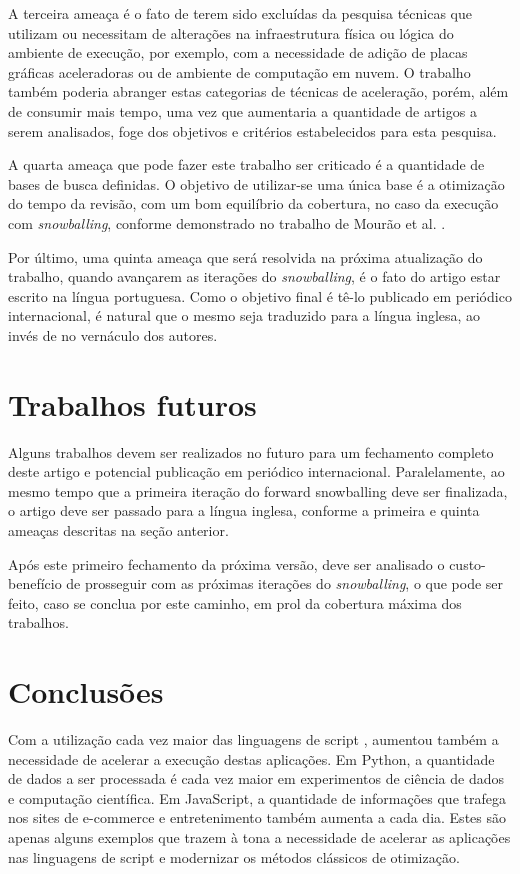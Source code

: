 \documentclass[sigconf]{acmart}
\begin{document}
A terceira ameaça é o fato de terem sido excluídas da pesquisa técnicas que utilizam ou necessitam de alterações na infraestrutura física ou lógica do ambiente de execução, por exemplo, com a necessidade de adição de placas gráficas aceleradoras ou de ambiente de computação em nuvem. O trabalho também poderia abranger estas categorias de técnicas de aceleração, porém, além de consumir mais tempo, uma vez que aumentaria a quantidade de artigos a serem analisados, foge dos objetivos e critérios estabelecidos para esta pesquisa. 

A quarta ameaça que pode fazer este trabalho ser criticado é a quantidade de bases de busca definidas. O objetivo de utilizar-se uma única base é a otimização do tempo da revisão, com um bom equilíbrio da cobertura, no caso da execução com \textit{snowballing}, conforme demonstrado no trabalho de Mourão et al. \cite{mourao2020performance}.

Por último, uma quinta ameaça que será resolvida na próxima atualização do trabalho, quando avançarem as iterações do \textit{snowballing}, é o fato do artigo estar escrito na língua portuguesa. Como o objetivo final é tê-lo publicado em periódico internacional, é natural que o mesmo seja traduzido para a língua inglesa, ao invés de no vernáculo dos autores.


\section{Trabalhos futuros}
Alguns trabalhos devem ser realizados no futuro para um fechamento completo deste artigo e potencial publicação em periódico internacional. Paralelamente, ao mesmo tempo que a primeira iteração do forward snowballing deve ser finalizada, o artigo deve ser passado para a língua inglesa, conforme a primeira e quinta ameaças descritas na seção anterior.

Após este primeiro fechamento da próxima versão, deve ser analisado o custo-benefício de prosseguir com as próximas iterações do \textit{snowballing}, o que pode ser feito, caso se conclua por este caminho, em prol da cobertura máxima dos trabalhos.


\section{Conclusões}
Com a utilização cada vez maior das linguagens de script , aumentou também a necessidade de acelerar a execução destas aplicações. Em Python, a quantidade de dados a ser processada é cada vez maior em experimentos de ciência de dados e computação científica. Em JavaScript, a quantidade de informações que trafega nos sites de e-commerce e entretenimento também aumenta a cada dia. Estes são apenas alguns exemplos que trazem à tona a necessidade de acelerar as aplicações nas linguagens de script e modernizar os métodos clássicos de otimização.
\end{document}
